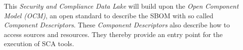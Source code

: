 This \textit{Security and Compliance Data Lake} will build upon the \textit{Open Component Model (OCM)}, an open standard to describe the SBOM with so called\textit{ Component Descriptors}. These \textit{Component Descriptors} also describe how to access sources and resources. They thereby provide an entry point for the execution of SCA tools.

\vfill
\titlespacing*{\chapter}{0pt}{50pt}{40pt}